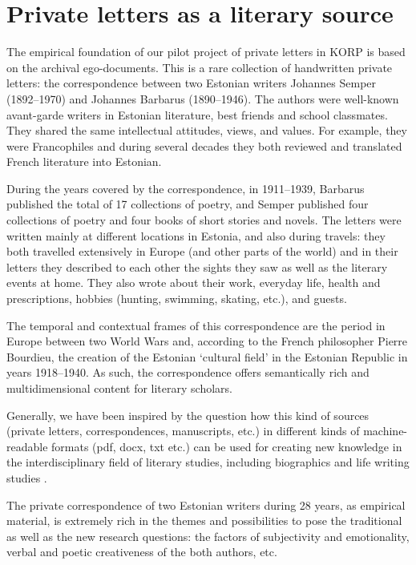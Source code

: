 \documentclass[runningheads]{llncs}
\begin{document}
\section{Private letters as a literary source}

The empirical foundation of our pilot project of private letters in KORP is based on the archival ego-documents. This is a rare collection of handwritten private letters: the correspondence between two Estonian writers Johannes Semper (1892--1970) and Johannes Barbarus (1890--1946). The authors were well-known avant-garde writers in Estonian literature, best friends and school classmates. They shared the same intellectual attitudes, views, and values. For example, they were Francophiles and during several decades they both reviewed and translated French literature into Estonian. 

During the years covered by the correspondence, in 1911--1939, Barbarus published the total of 17 collections of poetry, and Semper published four collections of poetry and four books of short stories and novels. The letters were written mainly at different locations in Estonia, and also during travels: they both travelled extensively in Europe (and other parts of the world) and in their letters they described to each other the sights they saw as well as the literary events at home. They also wrote about their work, everyday life, health and prescriptions, hobbies (hunting, swimming, skating, etc.), and guests. 

The temporal and contextual frames of this correspondence are the period in Europe between two World Wars and, according to the French philosopher Pierre Bourdieu, the creation of  the Estonian ‘cultural field’ in the Estonian Republic in years 1918--1940. As such, the correspondence offers semantically rich and multidimensional content for literary scholars.  

Generally, we have been inspired by the question how this kind of sources (private letters, correspondences, manuscripts, etc.) in different kinds of machine-readable formats (pdf, docx, txt etc.) can be used for creating new knowledge in the interdisciplinary field of literary studies, including biographics and life writing studies \cite{2015}. 

The private correspondence of two Estonian writers during 28 years, as empirical material, is extremely rich in the themes and possibilities to pose the traditional as well as the new research questions: the factors of subjectivity and emotionality, verbal and poetic creativeness of the both authors, etc.  
\end{document}
